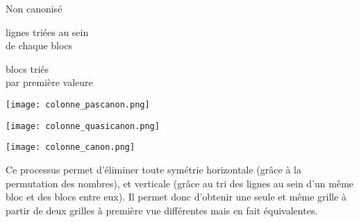 \documentclass[a4paper]{article}
\begin{document}
\begin{justify}
    \begin{center}
        \begin{minipage}[t]{0.3\textwidth}
            \begin{center}
                Non canonisé
            \end{center}
        \end{minipage}
        \begin{minipage}[t]{0.3\textwidth}
            \begin{center}
                lignes triées au sein \\ de chaque blocs
            \end{center}
        \end{minipage}
        \begin{minipage}[t]{0.3\textwidth}
            \begin{center}
                blocs triés \\ par première valeure
            \end{center}
        \end{minipage}
    \end{center}

    \begin{center}
    \begin{minipage}[t]{0.3\textwidth}
        \begin{center}
            \texttt{[image: colonne\_pascanon.png]}
        \end{center}
    \end{minipage}
    \begin{minipage}[t]{0.3\textwidth}
        \begin{center}
            \texttt{[image: colonne\_quasicanon.png]}
        \end{center}
    \end{minipage}
    \begin{minipage}[t]{0.3\textwidth}
        \begin{center}
            \texttt{[image: colonne\_canon.png]}
        \end{center}
    \end{minipage}
    \end{center}

    Ce processus permet d'éliminer toute symétrie horizontale (grâce à la permutation des nombres), et verticale (grâce au tri des lignes au sein d'un même bloc et des blocs entre eux). Il permet donc d'obtenir une seule et même grille à partir de deux grilles à première vue différentes mais en fait équivalentes.
\end{justify}
\end{document}
